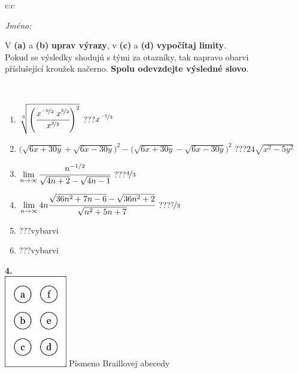 \documentclass[10pt]{report}
\begin{document}
\begin{tabular}{c:c}
\begin{minipage}[c][104.5mm][t]{0.5\linewidth}
\begin{center}
\textit{Jméno:}\phantom{xxxxxxxxxxxxxxxxxxxxxxxxxxxxxxxxxxxxxxxxxxxxxxxxxxxxxxxxxxxxxxxxx}\\[5mm]
\begin{minipage}{0.95\linewidth}
\begin{center}
V \textbf{(a)} a \textbf{(b)} \textbf{uprav výrazy}, v \textbf{(c)} a \textbf{(d)} \textbf{vypočítaj limity}.\\Pokud se výsledky shodujú s tými za otazníky, tak napravo obarvi\\příslušející kroužek načerno. \textbf{Spolu odevzdejte výsledné slovo}.
\end{center}
\end{minipage}
\\[1mm]
\begin{minipage}{0.79\linewidth}
\begin{center}
\begin{varwidth}{\linewidth}
\begin{enumerate}
\small
\item $\sqrt[3]{\left(\cfrac{x^{\nicefrac{-9}{2}}\;x^{\nicefrac{5}{2}}}{x^{\nicefrac{3}{2}}}\right)^{2}}$\quad \dotfill\; ???\;\dotfill \quad $x^{\nicefrac{-7}{3}}$
\item {\footnotesize{\scriptsize$\big(\sqrt{6x+30y}+\sqrt{6x-30y}\big)^2-\big(\sqrt{6x+30y}-\sqrt{6x-30y}\big)^2$}\quad \dotfill\; ???\;\dotfill \quad $24\sqrt{x^2-5y^2}$}
\item $\lim\limits_{n\to\infty}\cfrac{n^{-1/2}}{\sqrt{4n+2}-\sqrt{4n-1}}$\quad \dotfill\; ???\;\dotfill \quad $\nicefrac{4}{3}$
\item $\lim\limits_{n\to\infty}4n\cfrac{\sqrt{36n^2+7n-6}-\sqrt{36n^2+2}}{\sqrt{n^2+5n+7}}$\quad \dotfill\; ???\;\dotfill \quad $\nicefrac{7}{3}$
\item \quad \dotfill\; ???\;\dotfill \quad vybarvi
\item \quad \dotfill\; ???\;\dotfill \quad vybarvi
\end{enumerate}
\end{varwidth}
\end{center}
\end{minipage}
\begin{minipage}{0.20\linewidth}
\begin{center}
{\Huge\bfseries 4.} \\[2mm]
\includegraphics[height=40mm]{../images/braille.png}
{\small Písmeno Braillovej abecedy}
\end{center}
\end{minipage}
\end{center}
\end{minipage}
%
\end{tabular}
\end{document}

